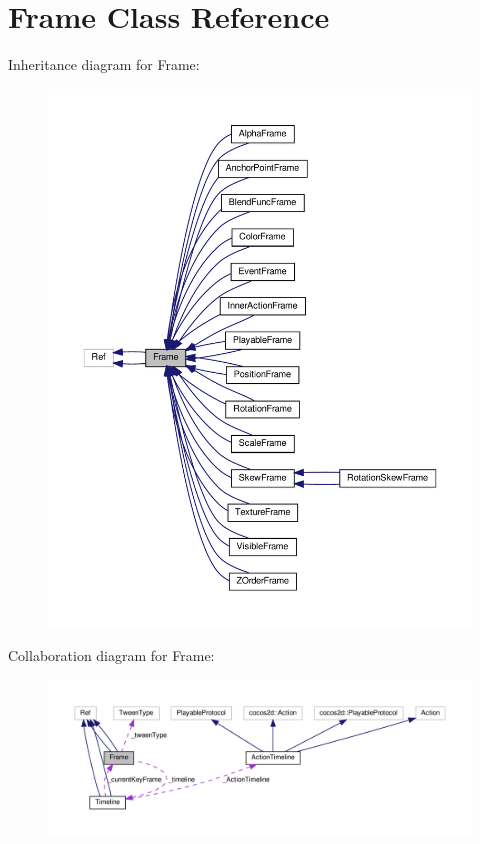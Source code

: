 \hypertarget{classFrame}{}\section{Frame Class Reference}
\label{classFrame}


Inheritance diagram for Frame\+:
\nopagebreak
\begin{figure}[H]
\begin{center}
\leavevmode
\includegraphics[width=350pt]{classFrame__inherit__graph}
\end{center}
\end{figure}


Collaboration diagram for Frame\+:
\nopagebreak
\begin{figure}[H]
\begin{center}
\leavevmode
\includegraphics[width=350pt]{classFrame__coll__graph}
\end{center}
\end{figure}
